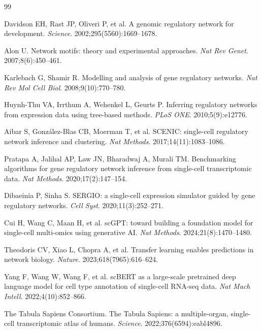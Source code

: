 \documentclass[11pt]{article}
\begin{document}
\begin{thebibliography}{99}

Davidson EH, Rast JP, Oliveri P, et al.
A genomic regulatory network for development.
\textit{Science}. 2002;295(5560):1669--1678.

Alon U.
Network motifs: theory and experimental approaches.
\textit{Nat Rev Genet}. 2007;8(6):450--461.

Karlebach G, Shamir R.
Modelling and analysis of gene regulatory networks.
\textit{Nat Rev Mol Cell Biol}. 2008;9(10):770--780.

Huynh-Thu VA, Irrthum A, Wehenkel L, Geurts P.
Inferring regulatory networks from expression data using tree-based methods.
\textit{PLoS ONE}. 2010;5(9):e12776.

Aibar S, Gonz{\'a}lez-Blas CB, Moerman T, et al.
SCENIC: single-cell regulatory network inference and clustering.
\textit{Nat Methods}. 2017;14(11):1083--1086.

Pratapa A, Jalihal AP, Law JN, Bharadwaj A, Murali TM.
Benchmarking algorithms for gene regulatory network inference from single-cell transcriptomic data.
\textit{Nat Methods}. 2020;17(2):147--154.

Dibaeinia P, Sinha S.
SERGIO: a single-cell expression simulator guided by gene regulatory networks.
\textit{Cell Syst}. 2020;11(3):252--271.

Cui H, Wang C, Maan H, et al.
scGPT: toward building a foundation model for single-cell multi-omics using generative AI.
\textit{Nat Methods}. 2024;21(8):1470--1480.

Theodoris CV, Xiao L, Chopra A, et al.
Transfer learning enables predictions in network biology.
\textit{Nature}. 2023;618(7965):616--624.

Yang F, Wang W, Wang F, et al.
scBERT as a large-scale pretrained deep language model for cell type annotation of single-cell RNA-seq data.
\textit{Nat Mach Intell}. 2022;4(10):852--866.

The Tabula Sapiens Consortium.
The Tabula Sapiens: a multiple-organ, single-cell transcriptomic atlas of humans.
\textit{Science}. 2022;376(6594):eabl4896.


\end{thebibliography}
\end{document}
